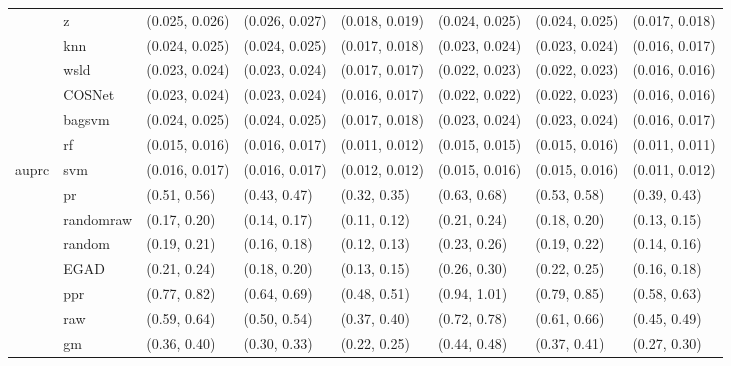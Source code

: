 \begin{table}[H]
{\begin{tabular}{llllllll}
 & z & (0.025, 0.026) & (0.026, 0.027) & (0.018, 0.019) & (0.024, 0.025) & (0.024, 0.025) & (0.017, 0.018)\\

 & knn & (0.024, 0.025) & (0.024, 0.025) & (0.017, 0.018) & (0.023, 0.024) & (0.023, 0.024) & (0.016, 0.017)\\

 & wsld & (0.023, 0.024) & (0.023, 0.024) & (0.017, 0.017) & (0.022, 0.023) & (0.022, 0.023) & (0.016, 0.016)\\

 & COSNet & (0.023, 0.024) & (0.023, 0.024) & (0.016, 0.017) & (0.022, 0.022) & (0.022, 0.023) & (0.016, 0.016)\\

 & bagsvm & (0.024, 0.025) & (0.024, 0.025) & (0.017, 0.018) & (0.023, 0.024) & (0.023, 0.024) & (0.016, 0.017)\\

 & rf & (0.015, 0.016) & (0.016, 0.017) & (0.011, 0.012) & (0.015, 0.015) & (0.015, 0.016) & (0.011, 0.011)\\

\multirow{-15}{*}{\raggedright\arraybackslash auprc} & svm & (0.016, 0.017) & (0.016, 0.017) & (0.012, 0.012) & (0.015, 0.016) & (0.015, 0.016) & (0.011, 0.012)\\
\cmidrule{1-8}
 & pr & (0.51, 0.56) & (0.43, 0.47) & (0.32, 0.35) & (0.63, 0.68) & (0.53, 0.58) & (0.39, 0.43)\\

 & randomraw & (0.17, 0.20) & (0.14, 0.17) & (0.11, 0.12) & (0.21, 0.24) & (0.18, 0.20) & (0.13, 0.15)\\

 & random & (0.19, 0.21) & (0.16, 0.18) & (0.12, 0.13) & (0.23, 0.26) & (0.19, 0.22) & (0.14, 0.16)\\

 & EGAD & (0.21, 0.24) & (0.18, 0.20) & (0.13, 0.15) & (0.26, 0.30) & (0.22, 0.25) & (0.16, 0.18)\\

 & ppr & (0.77, 0.82) & (0.64, 0.69) & (0.48, 0.51) & (0.94, 1.01) & (0.79, 0.85) & (0.58, 0.63)\\

 & raw & (0.59, 0.64) & (0.50, 0.54) & (0.37, 0.40) & (0.72, 0.78) & (0.61, 0.66) & (0.45, 0.49)\\

 & gm & (0.36, 0.40) & (0.30, 0.33) & (0.22, 0.25) & (0.44, 0.48) & (0.37, 0.41) & (0.27, 0.30)\\


\end{tabular}}
\end{table}
